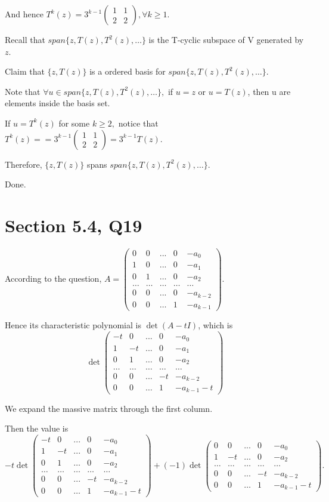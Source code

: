 \documentclass[12pt]{article}%
\begin{document}
And hence $T^{k}(z)=3^{k-1}\begin{pmatrix} 1&1\\2&2\end{pmatrix}, \forall k\geq 1.$ 

Recall that $span\{z,T(z),T^2(z),\dots\}$ is the T-cyclic subspace of V generated by $z$.

Claim that $\{z,T(z)\}$ is a ordered basis for $span\{z,T(z),T^2(z),\dots\}$.

Note that $\forall u \in span\{z,T(z),T^2(z),\dots\},$ if $u=z$ or $u=T(z)$, then u are elements inside the basis set.

If $u=T^{k}(z)$ for some $k\geq 2,$ notice that $T^{k}(z)==3^{k-1}\begin{pmatrix} 1&1\\2&2\end{pmatrix}=3^{k-1}T(z).$

Therefore, $\{z,T(z)\}$ spans $span\{z,T(z),T^2(z),\dots\}$.

Done.

\section{Section 5.4, Q19}

According to the question, $A=\begin{pmatrix} 0&0&...&0&-a_0\\1&0&...&0&-a_1\\0&1&\dots&0&-a_2\\\dots&\dots&\dots&\dots&\dots\\0&0&...&0&-a_{k-2}\\0&0&\dots&1&-a_{k-1}\end{pmatrix}.$

Hence its characteristic polynomial is $\det{(A-tI)}$, which is $$\det \begin{pmatrix} -t&0&...&0&-a_0\\1&-t&...&0&-a_1\\0&1&\dots&0&-a_2\\\dots&\dots&\dots&\dots&\dots\\0&0&...&-t&-a_{k-2}\\0&0&\dots&1&-a_{k-1}-t\end{pmatrix}$$

We expand the massive matrix through the first column. 

Then the value is $$-t \det \begin{pmatrix} -t&0&...&0&-a_0\\1&-t&...&0&-a_1\\0&1&\dots&0&-a_2\\\dots&\dots&\dots&\dots&\dots\\0&0&...&-t&-a_{k-2}\\0&0&\dots&1&-a_{k-1}-t\end{pmatrix}+(-1)\det \begin{pmatrix} 0&0&...&0&-a_0\\1&-t&\dots&0&-a_2\\\dots&\dots&\dots&\dots&\dots\\0&0&...&-t&-a_{k-2}\\0&0&\dots&1&-a_{k-1}-t\end{pmatrix}.$$ 
\end{document}
